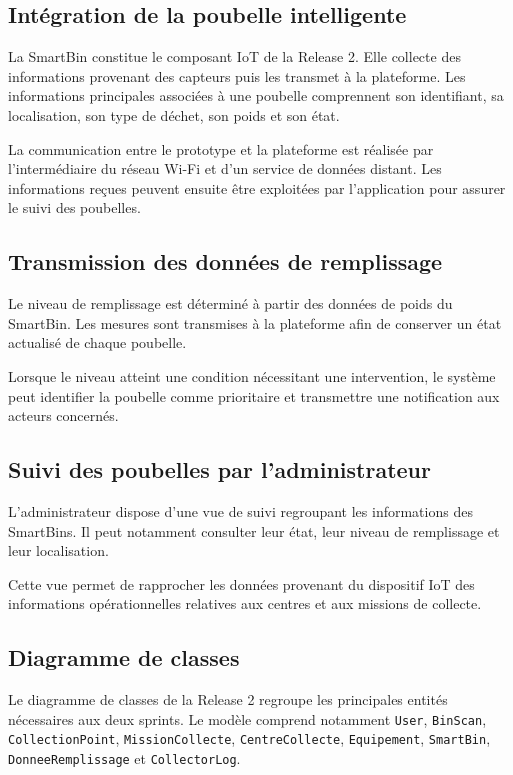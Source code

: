 {\subsection{Intégration de la poubelle intelligente}

La SmartBin constitue le composant IoT de la Release 2. Elle collecte des informations provenant des capteurs puis les transmet à la plateforme. Les informations principales associées à une poubelle comprennent son identifiant, sa localisation, son type de déchet, son poids et son état.

La communication entre le prototype et la plateforme est réalisée par l'intermédiaire du réseau Wi-Fi et d'un service de données distant. Les informations reçues peuvent ensuite être exploitées par l'application pour assurer le suivi des poubelles.

\subsection{Transmission des données de remplissage}

Le niveau de remplissage est déterminé à partir des données de poids du SmartBin. Les mesures sont transmises à la plateforme afin de conserver un état actualisé de chaque poubelle.

Lorsque le niveau atteint une condition nécessitant une intervention, le système peut identifier la poubelle comme prioritaire et transmettre une notification aux acteurs concernés.

\subsection{Suivi des poubelles par l'administrateur}

L'administrateur dispose d'une vue de suivi regroupant les informations des SmartBins. Il peut notamment consulter leur état, leur niveau de remplissage et leur localisation.

Cette vue permet de rapprocher les données provenant du dispositif IoT des informations opérationnelles relatives aux centres et aux missions de collecte.

\subsection{Diagramme de classes}

Le diagramme de classes de la Release 2 regroupe les principales entités nécessaires aux deux sprints. Le modèle comprend notamment \texttt{User}, \texttt{BinScan}, \texttt{CollectionPoint}, \texttt{MissionCollecte}, \texttt{CentreCollecte}, \texttt{Equipement}, \texttt{SmartBin}, \texttt{DonneeRemplissage} et \texttt{CollectorLog}.

}
